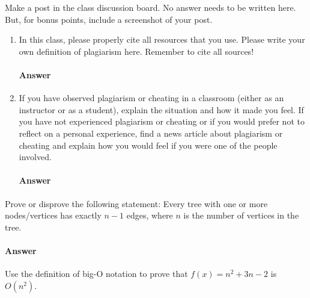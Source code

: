 \documentclass{article}
\begin{document}

Make a post in the class discussion board. No answer needs to be written here.
But, for bonus points, include a screenshot of your post.


\collab{\todo{}}

\begin{enumerate}

    \item In this class, please properly cite all resources that you use. Please
        write your own definition of plagiarism here.  Remember to cite all
        sources!

        \paragraph{Answer}
        \todo{}

    \item If you have observed plagiarism or cheating in a classroom (either as
        an instructor or as a student), explain the situation and how it made
        you feel.  If you have not experienced plagiarism or cheating or if you
        would prefer not to reflect on a personal experience, find a news
        article about plagiarism or cheating and explain how you would feel if
        you were one of the people involved.

        \paragraph{Answer}
        \todo{}
\end{enumerate}

\collab{\todo{}}

Prove or disprove the following statement: Every tree with one or more
nodes/vertices has exactly $n-1$ edges, where $n$ is the number of vertices in
the tree.

\paragraph{Answer}

\todo{}


\collab{\todo{}}
Use the definition of big-O notation to prove that $f(x)=n^2 + 3n -2$ is
$O(n^2)$.
\end{document}
